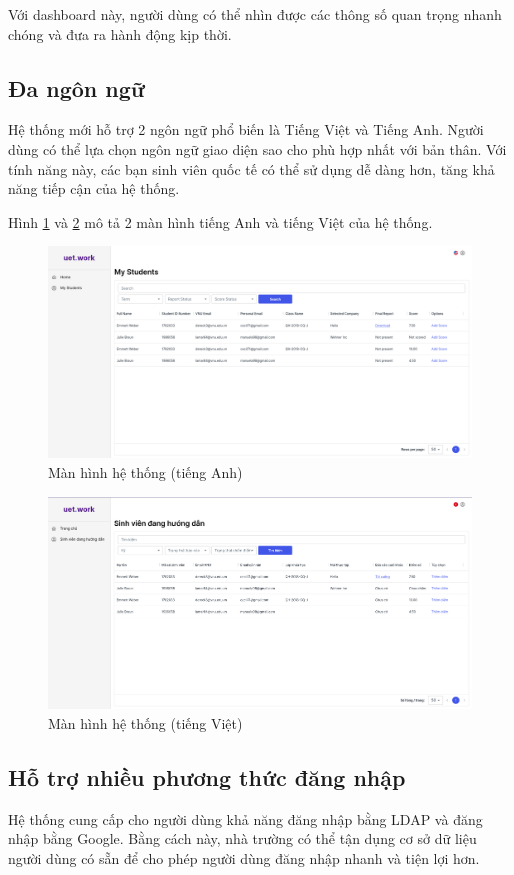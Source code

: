 \documentclass[./../main.tex]{subfiles}
\begin{document}
Với dashboard này, người dùng có thể nhìn được các thông số quan trọng
nhanh chóng và đưa ra hành động kịp thời.

\hypertarget{ux111a-nguxf4n-ngux1eef-1}{%
\subsection{Đa ngôn ngữ}\label{ux111a-nguxf4n-ngux1eef-1}}

Hệ thống mới hỗ trợ 2 ngôn ngữ phổ biến là Tiếng Việt và Tiếng Anh.
Người dùng có thể lựa chọn ngôn ngữ giao diện sao cho phù hợp nhất với
bản thân. Với tính năng này, các bạn sinh viên quốc tế có thể sử dụng dễ
dàng hơn, tăng khả năng tiếp cận của hệ thống.

Hình \ref{fig:en_page} và \ref{fig:vi_page} mô tả 2 màn hình tiếng Anh và tiếng Việt của hệ thống.

\begin{figure}[]
	\includegraphics[width=\linewidth]{./images/image13.png}
	\caption{Màn hình hệ thống (tiếng Anh)}
	\label{fig:en_page}
\end{figure}

\begin{figure}[]
	\includegraphics[width=\linewidth]{./images/image12.png}
	\caption{Màn hình hệ thống (tiếng Việt)}
	\label{fig:vi_page}
\end{figure}

\hypertarget{hux1ed7-trux1ee3-nhiux1ec1u-phux1b0ux1a1ng-thux1ee9c-ux111ux103ng-nhux1eadp}{%
\subsection{Hỗ trợ nhiều phương thức đăng
nhập}\label{hux1ed7-trux1ee3-nhiux1ec1u-phux1b0ux1a1ng-thux1ee9c-ux111ux103ng-nhux1eadp}}

Hệ thống cung cấp cho người dùng khả năng đăng nhập bằng LDAP và đăng
nhập bằng Google. Bằng cách này, nhà trường có thể tận dụng cơ sở dữ
liệu người dùng có sẵn để cho phép người dùng đăng nhập nhanh và tiện
lợi hơn.
\end{document}
